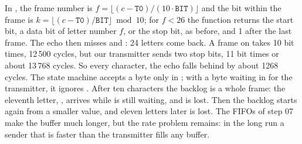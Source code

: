 \solution
In , the frame number is $f = \lfloor (c - \mathtt{T0}) /
(10 \cdot \mathtt{BIT}) \rfloor$ and the bit within the frame is $k =
\lfloor (c - \mathtt{T0}) / \mathtt{BIT} \rfloor \bmod 10$; for $f < 26$
the function returns the start bit, a data bit of letter number $f$, or the
stop bit, as before, and 1 after the last frame. The
echo then misses  and : 24 letters come back. A frame on 
takes 10 bit times, 12\,500 cycles, but our transmitter sends two stop bits,
11 bit times or about 13\,768 cycles. So every character, the echo falls
behind by about 1268 cycles. The state machine accepts a byte only in
; with a byte waiting in  for
the transmitter, it ignores . After ten characters the backlog
is a whole frame: the eleventh letter, , arrives while  is still
waiting, and is lost. Then the backlog starts again from a smaller value, and
eleven letters later  is lost. The FIFOs of step 07 make the buffer
much longer, but the rate problem remains: in the long run a sender that is
faster than the transmitter fills any buffer.
